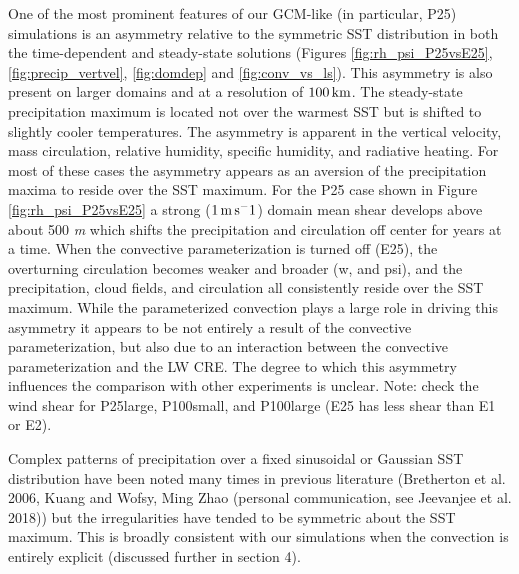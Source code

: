 \documentclass[11pt]{article}   	%
\begin{document}
One of the most prominent features of our GCM-like (in particular, P25) simulations is an asymmetry relative to the 
symmetric SST distribution in both the time-dependent and 
steady-state solutions (Figures \ref{fig:rh_psi_P25vsE25},  \ref{fig:precip_vertvel}, \ref{fig:domdep} and  \ref{fig:conv_vs_ls}).  
This asymmetry is also present on larger domains and at a resolution of $100 \, \rm{km}$. 
The steady-state precipitation maximum is located  not over the warmest SST but is
shifted to slightly cooler temperatures.  The asymmetry is apparent in the vertical velocity, mass circulation, relative humidity, 
specific humidity, and radiative heating.  
For most of these cases the asymmetry appears as an aversion of the precipitation maxima to reside over the SST maximum.  
For the P25 case shown in Figure \ref{fig:rh_psi_P25vsE25} a strong ($1 \, \rm{m \, s^-1}$) domain
mean shear develops above about 500 \textit{m} which shifts the precipitation and circulation off center for years at a time.
When the convective parameterization is turned off (E25), the overturning circulation becomes weaker and 
broader (w, and psi), and the precipitation, cloud fields, and 
circulation all consistently reside over the SST maximum.   
While the parameterized convection plays a large role in driving this asymmetry it appears to be not entirely a 
result of the convective parameterization, but also due to an interaction between the convective 
parameterization and the LW CRE.   The degree to which this asymmetry influences the comparison with other experiments is 
unclear.    Note: check the wind shear for P25large, P100small, and P100large (E25 has less shear than E1 or E2). 

Complex patterns of precipitation over a fixed sinusoidal or Gaussian SST distribution have been noted many times in 
previous literature (Bretherton et al. 2006, Kuang and Wofsy, Ming Zhao (personal communication, see Jeevanjee et al. 2018))
but the irregularities have 
tended to be symmetric about the SST maximum.  This is broadly consistent with our simulations when the convection is 
entirely explicit (discussed further in section 4).      

\end{document}
